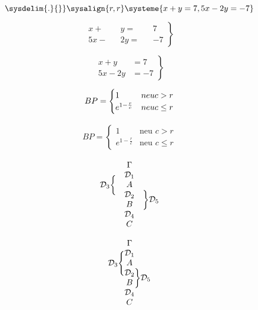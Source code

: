 \documentclass{article}
\begin{document}
	
	\[
	\sysdelim{.}{\rbrace}
	\sysalign{r,r}
	\systeme{
		x+y=7,
		5x-2y=-7
	}
	\]
	
	
	\vspace{1cm}
	
	\[
	\left.
	\begin{alignedat}{3}
		x +{}&& y ={}&& 7\\
		5x -{}&& 2y ={}&& -7
	\end{alignedat}
	\right\}
	\]
	
	
	\[
	\left.
	\begin{aligned}
		x + y   &= 7 \\
		5x - 2y &= -7
	\end{aligned}
	\right\}
	\]
	
	\begin{align}
		BP = 
		\begin{cases}  
			1 & neu \space c > r \\e^{1-\frac{r}{c}} & neu c \leq r 
		\end{cases}
	\end{align}
	
	
	\begin{align}
		BP = 
		\begin{cases} 
	 		1 & \text{neu } c > r \\e^{1-\frac{r}{c}} & \text{neu } c \leq r 
	 	\end{cases}
	\end{align}
	
	
	\[
	\begin{array}{rcl}
		& \Gamma & \\
		\multirow{3}{*}{$\mathcal{D}_3 \bigg\{$} 
		& \mathcal{D}_1 & \\
		& A & \\
		& \mathcal{D}_2 & \multirow{2}{*}{$\bigg\} \mathcal{D}_5$} \\
		& B & \\
		& \mathcal{D}_4 & \\
		& C &
	\end{array}
	\]
	
	
	\[
	\begin{array}{r@{}c@{}l}
		& \Gamma & \\
		\multirow{3}{*}{$\mathcal{D}_3 \Bigg\{$} 
		& \mathcal{D}_1 & \\
		& A & \\
		& \mathcal{D}_2 & \multirow{2}{*}{$\bigg\} \mathcal{D}_5$} \\
		& B & \\
		& \mathcal{D}_4 & \\
		& C &
	\end{array}
	\]
	
	
	
\end{document}
